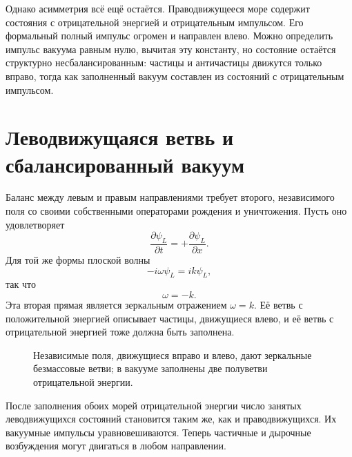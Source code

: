 Однако асимметрия всё ещё остаётся. Праводвижущееся море содержит состояния с отрицательной энергией и отрицательным импульсом. Его формальный полный импульс огромен и направлен влево. Можно определить импульс вакуума равным нулю, вычитая эту константу, но состояние остаётся структурно несбалансированным: частицы и античастицы движутся только вправо, тогда как заполненный вакуум составлен из состояний с отрицательным импульсом.

\section{Леводвижущаяся ветвь и сбалансированный вакуум}

Баланс между левым и правым направлениями требует второго, независимого поля со своими собственными операторами рождения и уничтожения. Пусть оно удовлетворяет
\begin{equation}
\frac{\partial\psi_L}{\partial t}
=
+\frac{\partial\psi_L}{\partial x}.
\end{equation}
Для той же формы плоской волны
\begin{equation}
-i\omega\psi_L=ik\psi_L,
\end{equation}
так что
\begin{equation}
\omega=-k.
\end{equation}
Эта вторая прямая является зеркальным отражением \(\omega=k\). Её ветвь с положительной энергией описывает частицы, движущиеся влево, и её ветвь с отрицательной энергией тоже должна быть заполнена.

\begin{figure}[htbp]
\centering
{}
\caption{Независимые поля, движущиеся вправо и влево, дают зеркальные безмассовые ветви; в вакууме заполнены две полуветви отрицательной энергии.}
\end{figure}

После заполнения обоих морей отрицательной энергии число занятых леводвижущихся состояний становится таким же, как и праводвижущихся. Их вакуумные импульсы уравновешиваются. Теперь частичные и дырочные возбуждения могут двигаться в любом направлении.

